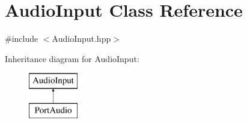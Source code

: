 \hypertarget{classAudioInput}{}\section{Audio\+Input Class Reference}
\label{classAudioInput}


{\ttfamily \#include $<$Audio\+Input.\+hpp$>$}

Inheritance diagram for Audio\+Input\+:\begin{figure}[H]
\begin{center}
\leavevmode
\includegraphics[height=2.000000cm]{classAudioInput}
\end{center}
\end{figure}
